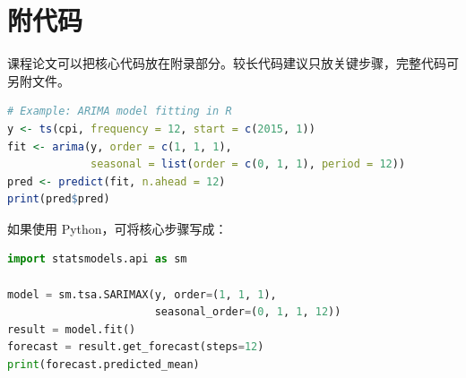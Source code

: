 \section{附代码}

课程论文可以把核心代码放在附录部分。较长代码建议只放关键步骤，完整代码可另附文件。

\begin{lstlisting}[language=R]
# Example: ARIMA model fitting in R
y <- ts(cpi, frequency = 12, start = c(2015, 1))
fit <- arima(y, order = c(1, 1, 1),
             seasonal = list(order = c(0, 1, 1), period = 12))
pred <- predict(fit, n.ahead = 12)
print(pred$pred)
\end{lstlisting}

如果使用 Python，可将核心步骤写成：

\begin{lstlisting}[language=Python]
import statsmodels.api as sm

model = sm.tsa.SARIMAX(y, order=(1, 1, 1),
                       seasonal_order=(0, 1, 1, 12))
result = model.fit()
forecast = result.get_forecast(steps=12)
print(forecast.predicted_mean)
\end{lstlisting}
